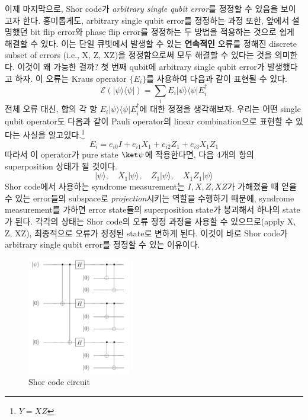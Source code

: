 이제 마지막으로, Shor code가 \textit{arbitrary single qubit error}를 정정할 수 있음을 보이고자 한다. 흥미롭게도, arbitrary single qubit error를 정정하는 과정 또한, 앞에서 설명했던 bit flip error와 phase flip error를 정정하는 두 방법을 적용하는 것으로 쉽게 해결할 수 있다.
이는 단일 큐빗에서 발생할 수 있는 \textbf{연속적인} 오류를 정해진 discrete subset of errors (i.e., X, Z, XZ)을 정정함으로써 모두 해결할 수 있다는 것을 의미한다.
이것이 왜 가능한 걸까? 첫 번째 qubit에 arbitrary single qubit error가 발생했다고 하자. 이 오류는 Kraus operator $\{E_i\}$를 사용하여 다음과 같이 표현될 수 있다.
\begin{equation*}
    \mathcal{E}(|\psi\rangle\langle\psi|)=\sum_i E_i|\psi\rangle\langle\psi| E_i^{\dagger}
\end{equation*}
전체 오류 대신, 합의 각 항 $E_i | \psi \rangle \langle \psi | E_i^\dagger$에 대한 정정을 생각해보자. 
우리는 어떤 single qubit operator도 다음과 같이 Pauli operator의 linear combination으로 표현할 수 있다는 사실을 알고있다.\footnote{$Y= XZ$}
\begin{equation*}
    E_i = e_{i0} I + e_{i1} X_1 + e_{i2} Z_1 + e_{i3} X_1Z_1
\end{equation*}
따라서 이 operator가 pure state $\ket \psi$에 작용한다면, 다음 4개의 항의 superposition 상태가 될 것이다.
\begin{equation*}
    |\psi\rangle, \quad X_1|\psi\rangle, \quad Z_1|\psi\rangle, \quad X_1 Z_1|\psi\rangle 
\end{equation*}
Shor code에서 사용하는 syndrome measurement는 $I, X, Z, XZ$가 가해졌을 때 얻을 수 있는 error들의 subspace로 \textit{projection}시키는 역할을 수행하기 때문에, syndrome measurement를 가하면 error state들의 superposition state가 붕괴해서 하나의 state가 된다.
각각의 상태는 Shor code의 오류 정정 과정을 사용할 수 있으므로(apply X, Z, XZ), 최종적으로 오류가 정정된 state로 변하게 된다. 
이것이 바로 Shor code가 arbitrary single qubit error를 정정할 수 있는 이유이다.

\begin{figure}[h]
    \centering
    \includegraphics[width=0.4\textwidth]{figures/Shor_code.png}
    \caption{Shor code circuit} \label{fig:Shor-circuit}
\end{figure}

